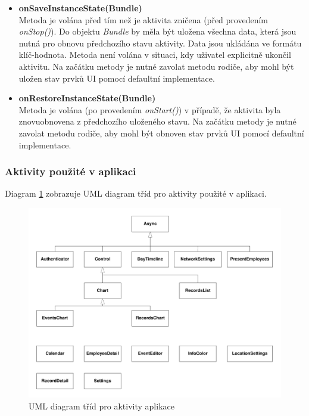 \documentclass{diplomka}
\begin{document}
\begin{itemize}[]
\item \textbf{onSaveInstanceState(Bundle)}\\
Metoda je volána před tím než je aktivita zničena (před provedením \emph{onStop()}). Do objektu \emph{Bundle} by měla být uložena všechna data, která jsou nutná pro obnovu předchozího stavu aktivity. Data jsou ukládána ve formátu klíč-hodnota. Metoda není volána v situaci, kdy uživatel explicitně ukončil aktivitu. Na začátku metody je nutné zavolat metodu rodiče, aby mohl být uložen stav prvků UI pomocí defaultní implementace.
\item \textbf{onRestoreInstanceState(Bundle)}\\
Metoda je volána (po provedením \emph{onStart()}) v případě, že aktivita byla znovuobnovena z předchozího uloženého stavu. Na začátku metody je nutné zavolat metodu rodiče, aby mohl být obnoven stav prvků UI pomocí defaultní implementace.
\end{itemize}


\subsubsection*{Aktivity použité v aplikaci}
Diagram \ref{fig:activityuml} zobrazuje UML diagram tříd pro aktivity použité v aplikaci.
\begin{figure}[H]
  \centering
  \includegraphics[scale=0.7]{visio/activity2.pdf}
\caption{UML diagram tříd pro aktivity aplikace}
\label{fig:activityuml}
\end{figure}
\end{document}

